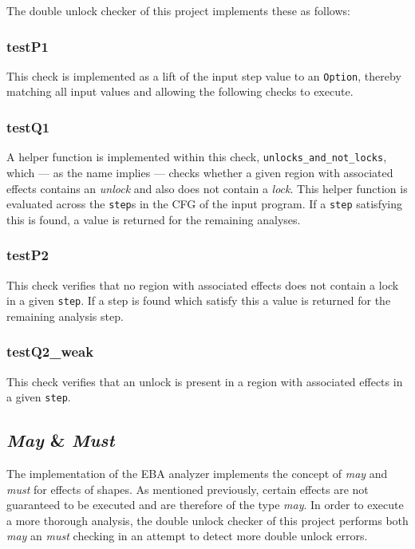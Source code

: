 \newpar The double unlock checker of this project implements these as follows: 

\subsubsection{testP1}
This check is implemented as a lift of the input step value to an \texttt{Option}, thereby matching all input values and allowing the following checks to execute.

\subsubsection{testQ1}
A helper function is implemented within this check, \texttt{unlocks\_and\_not\_locks}, which --- as the name implies --- checks whether a given region with associated effects contains an \textit{unlock} and also does not contain a \textit{lock}. This helper function is evaluated across the \texttt{step}s in the CFG of the input program. If a \texttt{step} satisfying this is found, a value is returned for the remaining analyses. 

\subsubsection{testP2}
This check verifies that no region with associated effects does not contain a lock in a given \texttt{step}. If a step is found which satisfy this a value is returned for the remaining analysis step. 

\subsubsection{testQ2\_weak}
This check verifies that an unlock is present in a region with associated effects in a given \texttt{step}.

\subsection{\textit{May} \& \textit{Must}}
\newpar The implementation of the EBA analyzer implements the concept of \textit{may} and \textit{must} for effects of shapes. As mentioned previously, certain effects are not guaranteed to be executed and are therefore of the type \textit{may}. In order to execute a more thorough analysis, the double unlock checker of this project performs both \textit{may} an \textit{must} checking in an attempt to detect more double unlock errors. 

